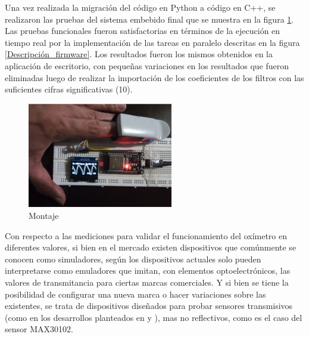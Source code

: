 \documentclass[journal]{IEEEtran}
\begin{document}
Una vez realizada la migración del código en Python a código en C++, se realizaron las pruebas del sistema embebido final que se muestra en la figura \ref{montaje_final}. Las pruebas funcionales fueron satisfactorias en términos de la ejecución en tiempo real por la implementación de las tareas en paralelo descritas en la figura \ref{Descripción_firmware}. Los resultados fueron los mismos obtenidos en la aplicación de escritorio, con pequeñas variaciones en los resultados que fueron eliminadas luego de realizar la importación de los coeficientes de los filtros con las suficientes cifras significativas (10).

\begin{figure}[!h]
	\centering
	\includegraphics[width=2.5in]{montaje_final.png}
	\caption{Montaje}
	\label{montaje_final}
\end{figure}

Con respecto a las mediciones para validar el funcionamiento del oxímetro en diferentes valores, si bien en el mercado existen dispositivos que comúnmente se conocen como simuladores, según \cite{G_There_is_no_such_thing_as_a_SpO2_simulator} los dispositivos actuales solo pueden interpretarse como emuladores que imitan, con elementos optoelectrónicos, las valores de transmitancia para ciertas marcas comerciales. Y si bien se tiene la posibilidad de configurar una nueva marca o hacer variaciones sobre las existentes, se trata de dispositivos diseñados para probar sensores transmisivos {\color{green}(como en los desarrollos planteados en \cite{G_oximetro_ijie} y \cite{G_validacion_oximetro_texas_fluke})},  mas no reflectivos, como es el caso del sensor MAX30102.
\end{document}
